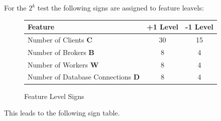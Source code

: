 \documentclass[milestone1.tex]{subfiles}
\begin{document}
For the $2^k$ test the following signs are assigned to feature leavels:\\


\begin{figure}[H]
	\begin{center}
\begin{tabular}{|l|c|c|}
\hline 
\textbf{Feature} & \textbf{+1 Level} & \textbf{-1 Level} \\ 
\hline 
Number of Clients \textbf{C} & 30 & 15 \\ 
\hline 
Number of Brokers \textbf{B} & 8 & 4 \\ 
\hline 
Number of Workers \textbf{W} & 8 & 4 \\ 
\hline 
Number of Database Connections \textbf{D} & 8 & 4 \\ 
\hline 
\end{tabular} 
\end{center}
\caption{Feature Level Signs}
\end{figure}

This leads to the following sign table.
\end{document}
